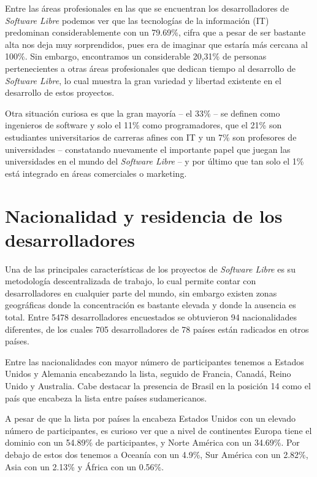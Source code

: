 Entre las áreas profesionales en las que se encuentran los desarrolladores de \textit{Software Libre} podemos ver que las tecnologías de la información (IT) predominan considerablemente con un 79.69\%, cifra que a pesar de ser bastante alta nos deja muy sorprendidos, pues era de imaginar que estaría más cercana al 100\%.  Sin embargo,  encontramos un considerable 20,31\% de personas pertenecientes a otras áreas profesionales que dedican tiempo al desarrollo de \textit{Software Libre}, lo cual muestra la gran variedad y libertad existente en el desarrollo de estos proyectos. 

Otra situación curiosa es que la gran mayoría  – el 33\% –  se definen como ingenieros de software y solo el 11\% como programadores, que el 21\% son estudiantes universitarios de carreras afines con IT y un 7\% son profesores de universidades  –  constatando nuevamente el importante papel que juegan las universidades en el mundo del \textit{Software Libre} –  y por último que tan solo el 1\% está integrado en áreas comerciales o marketing.
 
\section{Nacionalidad y residencia de los desarrolladores}

Una de las principales características de los proyectos de \textit{Software Libre} es su metodología descentralizada de trabajo, lo cual permite contar con desarrolladores en cualquier parte del mundo, sin embargo existen zonas geográficas donde la concentración es bastante elevada y donde la ausencia es total. Entre 5478 desarrolladores encuestados se obtuvieron 94 nacionalidades diferentes, de los cuales 705 desarrolladores de 78 países están radicados en otros países. 

Entre las nacionalidades con mayor número de participantes tenemos a Estados Unidos y Alemania encabezando la lista, seguido de Francia, Canadá, Reino Unido y Australia. Cabe destacar la presencia de Brasil en la posición 14 como el país que encabeza la lista entre países sudamericanos.

A pesar de que la lista por países la encabeza Estados Unidos con un elevado número de participantes, es curioso ver que a nivel de continentes Europa tiene el dominio con un 54.89\% de participantes, y Norte América con un 34.69\%. Por debajo de estos dos tenemos a Oceanía con un 4.9\%, Sur América con un 2.82\%, Asia con un 2.13\% y África con un 0.56\%.

